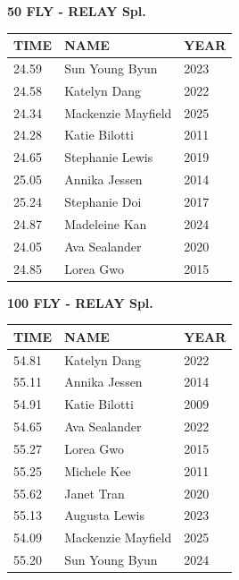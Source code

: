 \begin{table}[H]
\centering
\begin{minipage}[t]{0.6\textwidth}
\centering
\textbf{50 FLY - RELAY Spl.}\\[0.1cm]
\begin{tabular}{@{}p{1.8cm}p{2.8cm}p{1.2cm}@{}}
\hline
    \textbf{TIME} & \textbf{NAME} & \textbf{YEAR} \\
\hline
    24.59 & Sun Young Byun & 2023 \\
    24.58 & Katelyn Dang & 2022 \\
    24.34 & Mackenzie Mayfield & 2025 \\
    24.28 & Katie Bilotti & 2011 \\
    24.65 & Stephanie Lewis & 2019 \\
    25.05 & Annika Jessen & 2014 \\
    25.24 & Stephanie Doi & 2017 \\
    24.87 & Madeleine Kan & 2024 \\
    24.05 & Ava Sealander & 2020 \\
    24.85 & Lorea Gwo & 2015 \\
\hline
\end{tabular}
\end{minipage}
\end{table}

\begin{table}[H]
\centering
\begin{minipage}[t]{0.6\textwidth}
\centering
\textbf{100 FLY - RELAY Spl.}\\[0.1cm]
\begin{tabular}{@{}p{1.8cm}p{2.8cm}p{1.2cm}@{}}
\hline
    \textbf{TIME} & \textbf{NAME} & \textbf{YEAR} \\
\hline
    54.81 & Katelyn Dang & 2022 \\
    55.11 & Annika Jessen & 2014 \\
    54.91 & Katie Bilotti & 2009 \\
    54.65 & Ava Sealander & 2022 \\
    55.27 & Lorea Gwo & 2015 \\
    55.25 & Michele Kee & 2011 \\
    55.62 & Janet Tran & 2020 \\
    55.13 & Augusta Lewis & 2023 \\
    54.09 & Mackenzie Mayfield & 2025 \\
    55.20 & Sun Young Byun & 2024 \\
\hline
\end{tabular}
\end{minipage}
\end{table}

